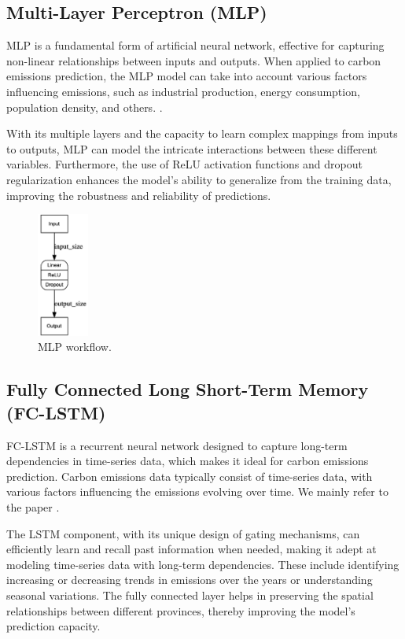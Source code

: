 \documentclass[sigconf, authordraft]{acmart}
\begin{document}
\subsection{Multi-Layer Perceptron (MLP)}

MLP is a fundamental form of artificial neural network, effective for capturing non-linear relationships between inputs and outputs. When applied to carbon emissions prediction, the MLP model can take into account various factors influencing emissions, such as industrial production, energy consumption, population density, and others. .

With its multiple layers and the capacity to learn complex mappings from inputs to outputs, MLP can model the intricate interactions between these different variables. Furthermore, the use of ReLU activation functions and dropout regularization enhances the model's ability to generalize from the training data, improving the robustness and reliability of predictions.

\begin{figure}[ht]
	\centering
	\includegraphics[width=0.15\textwidth]{figures/MLP_flow.png}
	\caption{MLP workflow.}
	\label{fig:MLP_flow}
\end{figure}

\subsection{Fully Connected Long Short-Term Memory (FC-LSTM)}

FC-LSTM is a recurrent neural network designed to capture long-term dependencies in time-series data, which makes it ideal for carbon emissions prediction. Carbon emissions data typically consist of time-series data, with various factors influencing the emissions evolving over time. We mainly refer to the paper \cite{tao2023-multiplea}.

The LSTM component, with its unique design of gating mechanisms, can efficiently learn and recall past information when needed, making it adept at modeling time-series data with long-term dependencies. These include identifying increasing or decreasing trends in emissions over the years or understanding seasonal variations. The fully connected layer helps in preserving the spatial relationships between different provinces, thereby improving the model's prediction capacity.
\end{document}
